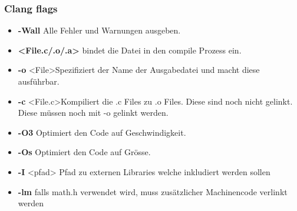 \subsubsection{Clang flags}
\begin{itemize}[itemsep=1pt, parsep=0pt]
    \item \textbf{-Wall} Alle Fehler und Warnungen ausgeben.
    \item \textbf{\textless{}File.c/.o/.a\textgreater{}} bindet die Datei in den compile Prozess ein.
    \item \textbf{-o} \textless{}File\textgreater{}Spezifiziert der Name der Ausgabedatei und macht diese ausführbar.
    \item \textbf{-c} \textless{}File.c\textgreater{}Kompiliert die  .c Files zu .o Files. Diese sind noch nicht gelinkt. Diese müssen noch mit -o gelinkt werden.
    \item \textbf{-O3} Optimiert den Code auf Geschwindigkeit.
    \item \textbf{-Os} Optimiert den Code auf Grösse.
    \item \textbf{-I} \textless{}pfad\textgreater{} Pfad zu externen Libraries welche inkludiert werden sollen
    \item \textbf{-lm} falls math.h verwendet wird, muss zusätzlicher Machinencode verlinkt werden
\end{itemize} 